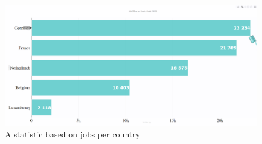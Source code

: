 \documentclass[conference,compsoc]{IEEEtran}
\begin{document}
\begin{figure}[hbt!]
  \centering
	\includegraphics[scale=0.4]{statistic.png} 
	\caption{A statistic based on jobs per country}
\end{figure}
\end{document}
